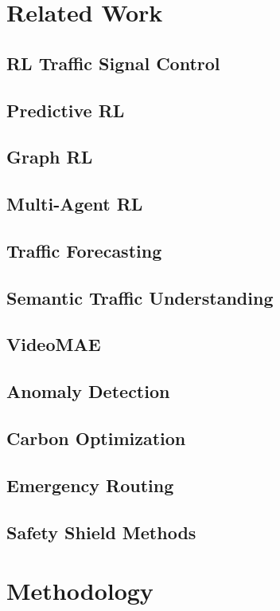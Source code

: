 \documentclass[journal]{IEEEtran}
\begin{document}
\section{Related Work}
\label{sec:related_work}
\subsection{RL Traffic Signal Control}
\cite{placeholder}
\subsection{Predictive RL}
\cite{placeholder}
\subsection{Graph RL}
\cite{placeholder}
\subsection{Multi-Agent RL}
\cite{placeholder}
\subsection{Traffic Forecasting}
\cite{placeholder}
\subsection{Semantic Traffic Understanding}
\cite{placeholder}
\subsection{VideoMAE}
\cite{placeholder}
\subsection{Anomaly Detection}
\cite{placeholder}
\subsection{Carbon Optimization}
\cite{placeholder}
\subsection{Emergency Routing}
\cite{placeholder}
\subsection{Safety Shield Methods}
\cite{placeholder}

\section{Methodology}
\label{sec:methodology}
\end{document}
